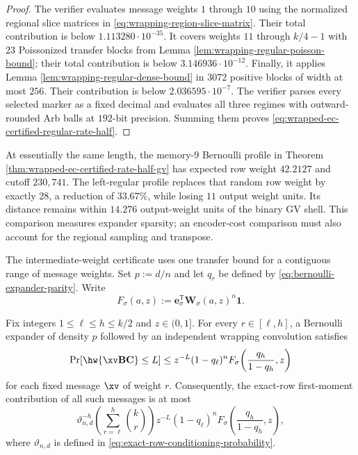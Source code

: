 \begin{proof}
The verifier  evaluates message
weights $1$ through $10$ using the normalized regional slice matrices in
\eqref{eq:wrapping-region-slice-matrix}.  Their total contribution is below
$1.113280\mathbin{\cdot}10^{-35}$.  It covers weights $11$ through
$k/4-1$ with $23$ Poissonized transfer blocks from Lemma
\ref{lem:wrapping-regular-poisson-bound}; their total contribution is below
$3.146936\mathbin{\cdot}10^{-12}$.  Finally, it applies Lemma
\ref{lem:wrapping-regular-dense-bound} in $3072$ positive blocks of width at
most $256$.  Their contribution is below
$2.036595\mathbin{\cdot}10^{-7}$.  The verifier parses every selected marker
as a fixed decimal and evaluates all three regimes with outward-rounded Arb
balls at $192$-bit precision.  Summing them proves
\eqref{eq:wrapped-ec-certified-regular-rate-half}.
\end{proof}

At essentially the same length, the memory-$9$ Bernoulli profile in Theorem
\ref{thm:wrapped-ec-certified-rate-half-gv} has expected row weight $42.2127$
and cutoff $230{,}741$.  The left-regular profile replaces that random row
weight by exactly $28$, a reduction of $33.67\%$, while losing $11$ output
weight units.  Its distance remains within $14.276$ output-weight units of the
binary GV shell.  This comparison measures expander sparsity; an encoder-cost
comparison must also account for the regional sampling and transpose.

The intermediate-weight certificate uses one transfer bound for a contiguous
range of message weights.  Set $p:=d/n$ and let $q_r$ be defined by
\eqref{eq:bernoulli-expander-parity}.  Write
\begin{equation}
 F_\sigma(a,z):=
 \mathbf e_\sigma^\mathsf{T}\mathbf W_\sigma(a,z)^n\mathbf 1.
 \label{eq:wrapping-bivariate-transform}
\end{equation}

\begin{lemma}
\label{lem:wrapping-uniform-block}
Fix integers $1\leq\ell\leq h\leq k/2$ and $z\in(0,1]$.  For every
$r\in[\ell,h]$, a Bernoulli expander of density $p$ followed by an independent
wrapping convolution satisfies
\begin{equation}
 \Pr[\hw{\xv\B\C}\leq L]
 \leq z^{-L}(1-q_\ell)^n
 F_\sigma\!\left(\frac{q_h}{1-q_h},z\right)
 \label{eq:wrapping-uniform-block-tail}
\end{equation}
for each fixed message $\xv$ of weight $r$.  Consequently, the exact-row
first-moment contribution of all such messages is at most
\begin{equation}
 \vartheta_{n,d}^{-h}
 \left(\sum_{r=\ell}^{h}\binom{k}{r}\right)
 z^{-L}(1-q_\ell)^n
 F_\sigma\!\left(\frac{q_h}{1-q_h},z\right),
 \label{eq:wrapping-uniform-exact-row-block}
\end{equation}
where $\vartheta_{n,d}$ is defined in
\eqref{eq:exact-row-conditioning-probability}.
\end{lemma}

